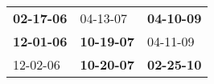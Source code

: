 \begin{supertabular}{p{0.33\columnwidth}p{0.33\columnwidth}p{0.33\columnwidth}}
 \textbf{02-17-06\textsuperscript{}} &           04-13-07\textsuperscript{} &  \textbf{04-10-09\textsuperscript{}} \\
 \textbf{12-01-06\textsuperscript{}} &  \textbf{10-19-07\textsuperscript{}} &           04-11-09\textsuperscript{} \\
          12-02-06\textsuperscript{} &  \textbf{10-20-07\textsuperscript{}} &  \textbf{02-25-10\textsuperscript{}} \\
\end{supertabular}
